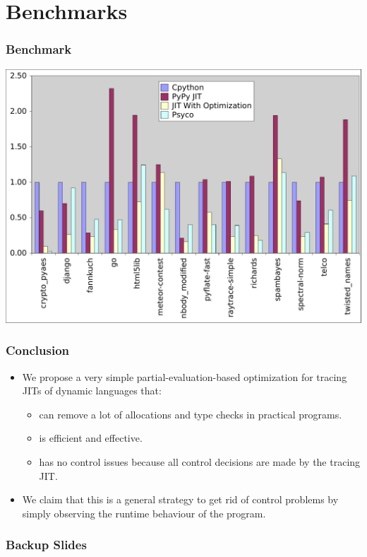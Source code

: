 \documentclass[utf8x]{beamer}
\begin{document}
\section{Benchmarks}

\begin{frame}
  \frametitle{Benchmark}
  \includegraphics[scale=0.4]{figures/benchmarks}
\end{frame}

\begin{frame}
  \frametitle{Conclusion}
  \begin{itemize}
      \item We propose a very simple partial-evaluation-based optimization for tracing
      JITs of dynamic languages that:
      \begin{itemize}
          \item can remove a lot of allocations and type checks in practical
          programs. 
          \item is efficient and effective.
          \item has no control issues because all control decisions are made by
          the tracing JIT.
      \end{itemize}
      \pause
      \item We claim that this is a general strategy to get rid of control
      problems by simply observing the runtime behaviour of the program.
  \end{itemize}
\end{frame}


\begin{frame}
  \frametitle{Backup Slides}
\end{frame}
\end{document}
